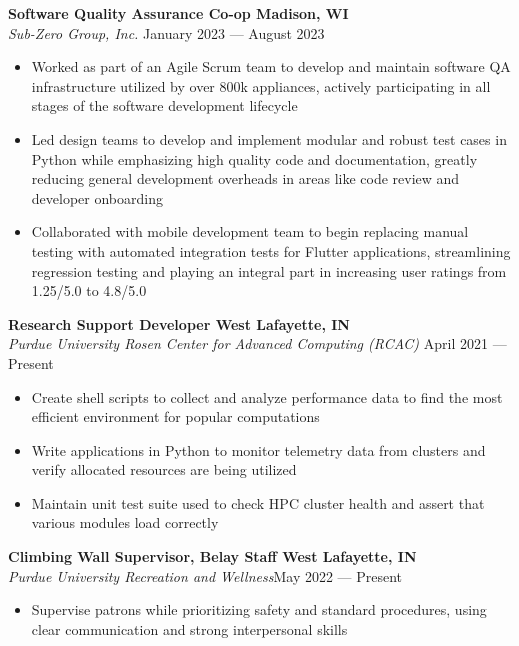 \documentclass[letter,11pt]{article}
\begin{document}
\textbf{Software Quality Assurance Co-op \hfill Madison, WI}\\
\emph{Sub-Zero Group, Inc.} \hfill January 2023 --- August 2023\\
\vspace*{-1.75em}
\begin{itemize}[label=-, leftmargin=*, align=left, noitemsep]
    \item Worked as part of an Agile Scrum team to develop and maintain software QA infrastructure utilized by over 800k appliances, actively participating in all stages of the software development lifecycle
    \item Led design teams to develop and implement modular and robust test cases in Python while emphasizing high quality code and documentation, greatly reducing general development overheads in areas like code review and developer onboarding
    \item Collaborated with mobile development team to begin replacing manual testing with automated integration tests for Flutter applications, streamlining regression testing and playing an integral part in increasing user ratings from 1.25/5.0 to 4.8/5.0
\end{itemize}
\vspace*{-0.25em}

\textbf{Research Support Developer \hfill West Lafayette, IN}\\
\emph{Purdue University Rosen Center for Advanced Computing (RCAC)} \hfill April 2021 --- Present \\
\vspace*{-1.75em}
\begin{itemize}[label=-, leftmargin=*, labelwidth=1.5cm, align=left, noitemsep]
    \item Create shell scripts to collect and analyze performance data to find the most efficient environment for popular computations
    \item Write applications in Python to monitor telemetry data from clusters and verify allocated resources are being utilized
    \item Maintain unit test suite used to check HPC cluster health and assert that various modules load correctly
\end{itemize}
\vspace*{-0.25em}

\textbf{Climbing Wall Supervisor, Belay Staff \hfill West Lafayette, IN}\\
\emph{Purdue University Recreation and Wellness}\hfill May 2022 --- Present \\
\vspace*{-1.75em}
\begin{itemize}[label=-, leftmargin=*, labelwidth=1.5cm, align=left, noitemsep]
    \item Supervise patrons while prioritizing safety and standard procedures, using clear communication and strong interpersonal skills
\end{itemize}
\end{document}
